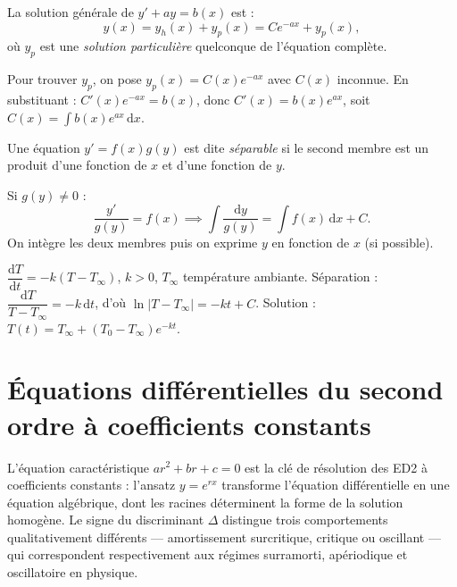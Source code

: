 \documentclass[11pt,a4paper,twoside]{book}
\begin{document}
\begin{theoremebox}
La solution générale de $y' + ay = b(x)$ est :
\[
  y(x) = y_h(x) + y_p(x) = Ce^{-ax} + y_p(x),
\]
où $y_p$ est une \emph{solution particulière} quelconque de l'équation complète.
\end{theoremebox}

\begin{methodebox}
Pour trouver $y_p$, on pose $y_p(x) = C(x)e^{-ax}$ avec $C(x)$ inconnue.
En substituant : $C'(x)e^{-ax} = b(x)$, donc $C'(x) = b(x)e^{ax}$, soit $C(x) = \int b(x)e^{ax}\,\mathrm{d}x$.
\end{methodebox}

\begin{definitionbox}[ED1 séparable]
Une équation $y' = f(x)g(y)$ est dite \emph{séparable} si le second membre est un produit d'une fonction de $x$ et d'une fonction de $y$.
\end{definitionbox}

\begin{methodebox}
Si $g(y) \neq 0$ :
\[
  \frac{y'}{g(y)} = f(x) \implies \int \frac{\mathrm{d}y}{g(y)} = \int f(x)\,\mathrm{d}x + C.
\]
On intègre les deux membres puis on exprime $y$ en fonction de $x$ (si possible).
\end{methodebox}

\begin{exemplebox}
$\dfrac{\mathrm{d}T}{\mathrm{d}t} = -k(T - T_\infty)$, $k > 0$, $T_\infty$ température ambiante.
Séparation : $\dfrac{\mathrm{d}T}{T-T_\infty} = -k\,\mathrm{d}t$, d'où $\ln|T-T_\infty| = -kt + C$.
Solution : $T(t) = T_\infty + (T_0 - T_\infty)e^{-kt}$.
\end{exemplebox}

\section{Équations différentielles du second ordre à coefficients constants}

L'équation caractéristique $ar^2 + br + c = 0$ est la clé de résolution des ED2 à coefficients constants : l'ansatz $y = e^{rx}$ transforme l'équation différentielle en une équation algébrique, dont les racines déterminent la forme de la solution homogène. Le signe du discriminant $\Delta$ distingue trois comportements qualitativement différents — amortissement surcritique, critique ou oscillant — qui correspondent respectivement aux régimes surramorti, apériodique et oscillatoire en physique.
\end{document}
